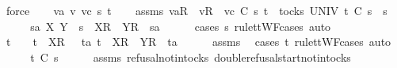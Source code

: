 \ force\isanewline
{}\isamarkupfalse%
\isanewline
\ \ \isamarkupfalse%
\ va\ v\ vc\ s{}{\isacharprime}\ t\isanewline
\ \ \isamarkupfalse%
\ assms{\isacharcolon}\ {\isachardoublequoteopen}{\isacharbrackleft}va{\isacharbrackright}\isactrlsub R\ {\isacharhash}\ {\isacharbrackleft}v{\isacharbrackright}\isactrlsub R\ {\isacharhash}\ vc\ {\isasymsubseteq}\isactrlsub C\ s{}{\isacharprime}{\isachardoublequoteclose}\ {\isachardoublequoteopen}t\ {\isasymin}\ tocks\ UNIV{\isachardoublequoteclose}\ {\isachardoublequoteopen}t\ {\isasymle}\isactrlsub C\ s{}{\isacharprime}\ {\isacharat}\ s{}{\isachardoublequoteclose}\isanewline
\ \ \isamarkupfalse%
\ \isamarkupfalse%
\ s{}{\isacharprime}a\ X\ Y\ \ {\isachardoublequoteopen}s{}{\isacharprime}\ {\isacharequal}\ {\isacharbrackleft}X{\isacharbrackright}\isactrlsub R\ {\isacharhash}\ {\isacharbrackleft}Y{\isacharbrackright}\isactrlsub R\ {\isacharhash}\ s{}{\isacharprime}a{\isachardoublequoteclose}\isanewline
\ \ \ \ \isamarkupfalse%
\ {\isacharparenleft}cases\ s{}{\isacharprime}\ rule{\isacharcolon}ttWF{\isachardot}cases{\isacharcomma}\ auto{\isacharparenright}\isanewline
\ \ \isamarkupfalse%
\ \isamarkupfalse%
\ {\isachardoublequoteopen}t\ {\isacharequal}\ {\isacharbrackleft}{\isacharbrackright}\ {\isasymor}\ t\ {\isacharequal}\ {\isacharbrackleft}{\isacharbrackleft}X{\isacharbrackright}\isactrlsub R{\isacharbrackright}\ {\isasymor}\ {\isacharparenleft}{\isasymexists}\ ta{\isachardot}\ t\ {\isacharequal}\ {\isacharbrackleft}X{\isacharbrackright}\isactrlsub R\ {\isacharhash}\ {\isacharbrackleft}Y{\isacharbrackright}\isactrlsub R\ {\isacharhash}\ ta{\isacharparenright}{\isachardoublequoteclose}\isanewline
\ \ \ \ \isamarkupfalse%
\ assms{\isacharparenleft}{}{\isacharparenright}\ \isamarkupfalse%
\ {\isacharparenleft}cases\ t\ rule{\isacharcolon}ttWF{\isachardot}cases{\isacharcomma}\ auto{\isacharparenright}\isanewline
\ \ \isamarkupfalse%
\ \isamarkupfalse%
\ {\isachardoublequoteopen}t\ {\isasymle}\isactrlsub C\ s{}{\isacharprime}{\isachardoublequoteclose}\isanewline
\ \ \ \ \isamarkupfalse%
\ assms{\isacharparenleft}{}{\isacharparenright}\ refusal{\isacharunderscore}notin{\isacharunderscore}tocks\ double{\isacharunderscore}refusal{\isacharunderscore}start{\isacharunderscore}notin{\isacharunderscore}tocks\ \isamarkupfalse%
